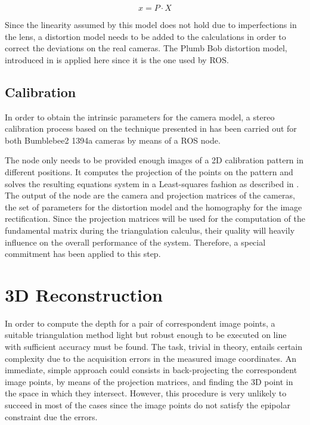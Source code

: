 \begin{equation}
x = P·X
\label{eq:pinhole_model}
\end{equation}  

Since the linearity assumed by this model does not hold due to imperfections in the lens, a distortion model needs to be added to the calculations in order to correct the deviations on the real cameras. 
The Plumb Bob distortion model, introduced in \cite{Brown} is applied here since it is the one used by ROS.

\subsection{Calibration}
In order to obtain the intrinsic parameters for the camera model, a stereo calibration process based on the technique presented in \cite{Zhang} has been carried out for both Bumblebee2 1394a cameras by means of a ROS node. 

The node only needs to be provided enough images of a 2D calibration pattern in different positions. 
It computes the projection of the points on the pattern and solves the resulting equations system in a Least-squares fashion as described in \cite{Hartley}. 
The output of the node are the camera and projection matrices of the cameras, the set of parameters for the distortion model and the homography for the image rectification. 
Since the projection matrices will be used for the computation of the fundamental matrix during the triangulation calculus, their quality will heavily influence on the overall performance of the system. 
Therefore, a special commitment has been applied to this step. 

\section{3D Reconstruction}
In order to compute the depth for a pair of correspondent image points, a suitable triangulation method light but robust enough to be executed on line with sufficient accuracy must be found. 
The task, trivial in theory, entails certain complexity due to the acquisition errors in the measured image coordinates. 
An immediate, simple approach could consists in back-projecting the correspondent image points, by means of the projection matrices, and finding the 3D point in the space in which they intersect. 
However, this procedure is very unlikely to succeed in most of the cases since the image points do not satisfy the epipolar constraint due the errors.

